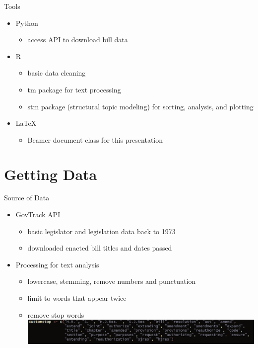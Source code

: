 \documentclass[12pt]{beamer}
\begin{document}
\begin{frame}{Tools}
	\begin{itemize}
		\item Python
			\begin{itemize}
			\item access API to download bill data
			\end{itemize}
		\item R
			\begin{itemize}
			\item basic data cleaning 
			\item tm package for text processing
			\item stm package (structural topic modeling) for 								sorting, analysis, and plotting
			\end{itemize}
	\item \LaTeX
			\begin{itemize}
			\item Beamer document class for this presentation
			\end{itemize}
	\end{itemize}
\end{frame}

\section{Getting Data}
\begin{frame}{Source of Data}
	\begin{itemize}
		\item GovTrack API
		\begin{itemize}
			\item basic legislator and legislation data back to 1973
			\item downloaded enacted bill titles and dates passed
		\end{itemize}
		\item Processing for text analysis
		\begin{itemize}
			\item lowercase, stemming, remove numbers and punctuation
			\item limit to words that appear twice
			\item remove stop words 
			\includegraphics[scale=.4]{stopwords.png}
		\end{itemize}
\end{itemize}
\end{frame}
\end{document}
